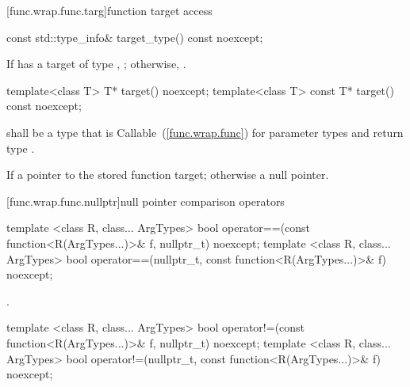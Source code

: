 [func.wrap.func.targ]{function target access}

%
%
\begin{itemdecl}
const std::type_info& target_type() const noexcept;
\end{itemdecl}

\begin{itemdescr}
\pnum\returns If  has a target of type ,
  ; otherwise, .
\end{itemdescr}

%
%
\begin{itemdecl}
template<class T>       T* target() noexcept;
template<class T> const T* target() const noexcept;
\end{itemdecl}

\begin{itemdescr}
\pnum
\requires {} shall be a type that is
Callable~(\ref{func.wrap.func}) for parameter types
and return type .

\pnum\returns If 
a pointer to the stored function target; otherwise a null pointer.
\end{itemdescr}

[func.wrap.func.nullptr]{null pointer comparison operators}

%
%
\begin{itemdecl}
template <class R, class... ArgTypes>
  bool operator==(const function<R(ArgTypes...)>& f, nullptr_t) noexcept;
template <class R, class... ArgTypes>
  bool operator==(nullptr_t, const function<R(ArgTypes...)>& f) noexcept;
\end{itemdecl}

\begin{itemdescr}
\pnum\returns {}.
\end{itemdescr}

%
%
\begin{itemdecl}
template <class R, class... ArgTypes>
  bool operator!=(const function<R(ArgTypes...)>& f, nullptr_t) noexcept;
template <class R, class... ArgTypes>
  bool operator!=(nullptr_t, const function<R(ArgTypes...)>& f) noexcept;
\end{itemdecl}

